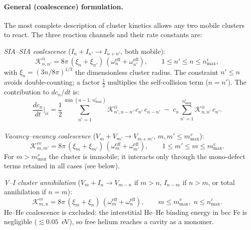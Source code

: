 \paragraph{General (coalescence) formulation.}
The most complete description of cluster kinetics allows any two mobile
clusters to react. The three reaction channels and their rate constants
are:

\textit{SIA--SIA coalescence} ($I_n + I_{n'} \to I_{n+n'}$, both mobile):
\begin{equation}\label{eq:K_ii}
    \mathcal{K}_{n,n'}^{ii}
    = 8\pi\,(\xi_n + \xi_{n'})\,
      (\omega_n^{\mathrm{eff}} + \omega_{n'}^{\mathrm{eff}}),
    \qquad 1 \leq n' \leq n \leq n_{\max}^i,
\end{equation}
with $\xi_n = (3n/8\pi)^{1/3}$ the dimensionless cluster radius. The
constraint $n' \leq n$ avoids double-counting; a factor $\tfrac{1}{2}$
multiplies the self-collision term ($n = n'$). The contribution to $dc_n/dt$
is:
\begin{equation}\label{eq:rate_ii}
    \frac{dc_n}{dt}\bigg|_{ii}
    = \frac{1}{2}\!\sum_{\substack{n'=1\\}}^{\min(n-1,\,n_{\max}^i)}
      \!\!\mathcal{K}_{n',n-n'}^{ii}\,c_{n'}\,c_{n-n'}
    \;-\; c_n \sum_{n'=1}^{n_{\max}^i}
      \mathcal{K}_{n,n'}^{ii}\,c_{n'}.
\end{equation}

\textit{Vacancy--vacancy coalescence} ($V_m + V_{m'} \to V_{m+m'}$,
$m, m' \leq m_{\max}^v$):
\begin{equation}\label{eq:K_vv}
    \mathcal{K}_{m,m'}^{vv}
    = 8\pi\,(\xi_m + \xi_{m'})\,
      (\omega_m^{\mathrm{eff}} + \omega_{m'}^{\mathrm{eff}}),
    \qquad 1 \leq m' \leq m \leq m_{\max}^v.
\end{equation}
For $m > m_{\max}^v$ the cluster is immobile; it interacts only through the
mono-defect terms retained in all cases (see below).

\textit{V--I cluster annihilation} ($V_m + I_n \to V_{m-n}$ if $m > n$,
$I_{n-m}$ if $n > m$, or total annihilation if $n = m$):
\begin{equation}\label{eq:K_vi}
    \mathcal{K}_{m,n}^{vi}
    = 8\pi\,(\xi_m + \xi_n)\,
      (\omega_m^{\mathrm{eff}} + \omega_n^{\mathrm{eff}}),
    \qquad m \leq m_{\max}^v,\; n \leq n_{\max}^i.
\end{equation}
He--He coalescence is excluded: the interstitial He--He binding energy in
bcc Fe is negligible ($\lesssim 0.05$~eV), so free helium reaches a cavity
as a monomer.

